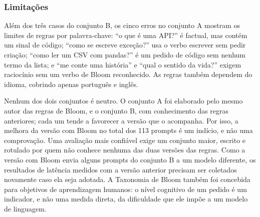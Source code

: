 \subsubsection{Limitações}

Além dos três casos do conjunto B, os cinco erros no conjunto A mostram os limites de regras por palavra-chave: ``o que é uma API?'' é factual, mas contém um sinal de código; ``como se escreve exceção?'' usa o verbo escrever sem pedir criação; ``como ler um CSV com pandas?'' é um pedido de código sem nenhum termo da lista; e ``me conte uma história'' e ``qual o sentido da vida?'' exigem raciocínio sem um verbo de Bloom reconhecido. As regras também dependem do idioma, cobrindo apenas português e inglês.

Nenhum dos dois conjuntos é neutro. O conjunto A foi elaborado pelo mesmo autor das regras de Bloom, e o conjunto B, com conhecimento das regras anteriores; cada um tende a favorecer a versão que o acompanha. Por isso, a melhora da versão com Bloom no total dos 113 prompts é um indício, e não uma comprovação. Uma avaliação mais confiável exige um conjunto maior, escrito e rotulado por quem não conhece nenhuma das duas versões das regras. Como a versão com Bloom envia alguns prompts do conjunto B a um modelo diferente, os resultados de latência medidos com a versão anterior precisam ser coletados novamente caso ela seja adotada. A Taxonomia de Bloom também foi concebida para objetivos de aprendizagem humanos: o nível cognitivo de um pedido é um indicador, e não uma medida direta, da dificuldade que ele impõe a um modelo de linguagem.
